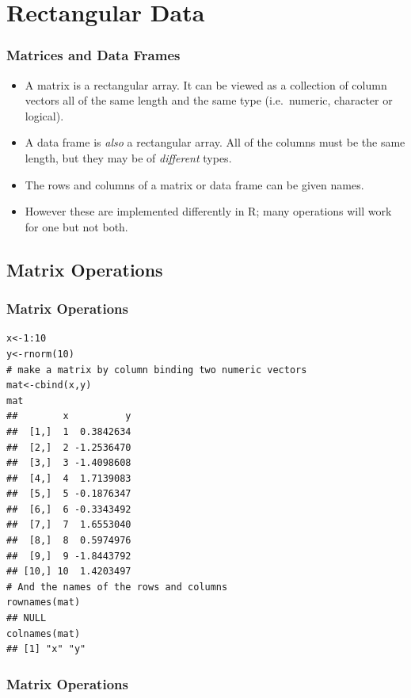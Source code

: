 \documentclass[]{article}
\theoremstyle{definition}
\theoremstyle{definition}
\theoremstyle{remark}
\begin{document}
\section{Rectangular Data}\label{rectangular-data}

\subsubsection{Matrices and Data Frames}\label{matrices-and-data-frames}

\begin{itemize}
\item
  {A matrix is a rectangular array. It can be viewed as a collection of
  column vectors all of the same length and the same type (i.e.~numeric,
  character or logical).}
\item
  {A data frame is \emph{also} a rectangular array. All of the columns
  must be the same length, but they may be of \emph{different} types.}
\item
  {The rows and columns of a matrix or data frame can be given names.}
\item
  {However these are implemented differently in R; many operations will
  work for one but not both.}
\end{itemize}

\subsection{Matrix Operations}\label{matrix-operations}

\subsubsection{Matrix Operations}\label{matrix-operations-1}

\begin{verbatim}
x<-1:10 
y<-rnorm(10)
# make a matrix by column binding two numeric vectors
mat<-cbind(x,y)
mat
##        x          y
##  [1,]  1  0.3842634
##  [2,]  2 -1.2536470
##  [3,]  3 -1.4098608
##  [4,]  4  1.7139083
##  [5,]  5 -0.1876347
##  [6,]  6 -0.3343492
##  [7,]  7  1.6553040
##  [8,]  8  0.5974976
##  [9,]  9 -1.8443792
## [10,] 10  1.4203497
# And the names of the rows and columns
rownames(mat)
## NULL
colnames(mat)
## [1] "x" "y"
\end{verbatim}

\subsubsection{Matrix Operations}\label{matrix-operations-2}
\end{document}
